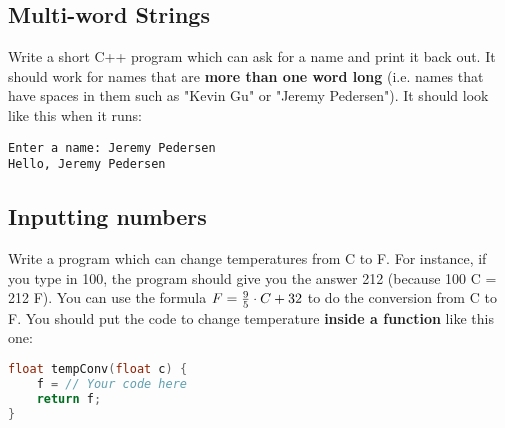 \documentclass[a4paper,12pt]{article} %
\begin{document}
\subsection*{Multi-word Strings}

Write a short C++ program which can ask for a name and print it back out. It should work for names that are \textbf{more than one word long} (i.e. names that have spaces in them such as "Kevin Gu" or "Jeremy Pedersen"). It should look like this when it runs:

\begin{verbatim}
Enter a name: Jeremy Pedersen
Hello, Jeremy Pedersen
\end{verbatim}

\subsection*{Inputting numbers}

Write a program which can change temperatures from C to F. For instance, if you type in 100, the program should give you the answer 212 (because 100 C = 212 F). You can use the formula $F = {9 \over 5} \cdot C + 32$ to do the conversion from C to F. You should put the code to change temperature \textbf{inside a function} like this one:

\vspace{5mm}
\begin{lstlisting}[language=C++]
float tempConv(float c) {
	f = // Your code here
	return f;
}
\end{lstlisting}
\end{document}

